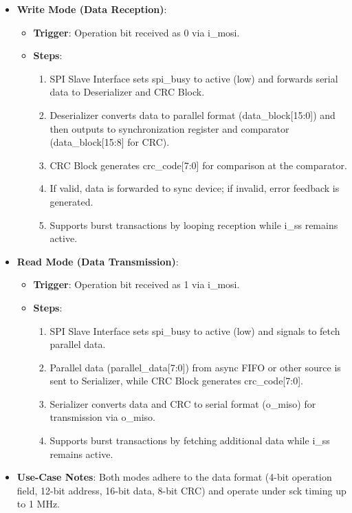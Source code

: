 \begin{itemize}[nosep]
    \item \textbf{Write Mode (Data Reception)}:
    \begin{itemize}[nosep]
        \item \textbf{Trigger}: Operation bit received as 0 via i\_mosi.
        \item \textbf{Steps}:
        \begin{enumerate}[nosep]
            \item SPI Slave Interface sets spi\_busy to active (low) and forwards serial data to Deserializer and CRC Block.
            \item Deserializer converts data to parallel format (data\_block[15:0]) and then outputs to synchronization register and comparator (data\_block[15:8] for CRC).
            \item CRC Block generates crc\_code[7:0] for comparison at the comparator.
            \item If valid, data is forwarded to sync device; if invalid, error feedback is generated.
            \item Supports burst transactions by looping reception while i\_ss remains active.
        \end{enumerate}
    \end{itemize}
    \item \textbf{Read Mode (Data Transmission)}:
    \begin{itemize}[nosep]
        \item \textbf{Trigger}: Operation bit received as 1 via i\_mosi.
        \item \textbf{Steps}:
        \begin{enumerate}[nosep]
            \item SPI Slave Interface sets spi\_busy to active (low) and signals to fetch parallel data.
            \item Parallel data (parallel\_data[7:0]) from async FIFO or other source is sent to Serializer, while CRC Block generates crc\_code[7:0].
            \item Serializer converts data and CRC to serial format (o\_miso) for transmission via o\_miso.
            \item Supports burst transactions by fetching additional data while i\_ss remains active.
        \end{enumerate}
    \end{itemize}
    \item \textbf{Use-Case Notes}: Both modes adhere to the data format (4-bit operation field, 12-bit address, 16-bit data, 8-bit CRC) and operate under sck timing up to 1 MHz.
\end{itemize}

